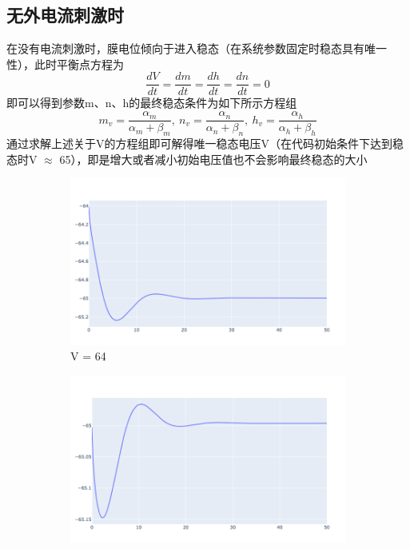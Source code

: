 \documentclass[nols, a4paper]{tufte-handout}
\begin{document}
\subsection{无外电流刺激时}
在没有电流刺激时，膜电位倾向于进入稳态（在系统参数固定时稳态具有唯一性），此时平衡点方程为
\[
\frac{dV}{dt} = \frac{dm}{dt} = \frac{dh}{dt} = \frac{dn}{dt} = 0 
\]
即可以得到参数m、n、h的最终稳态条件为如下所示方程组
\[
m_v = \frac{\alpha_m}{\alpha_m + \beta_m}, \ n_v = \frac{\alpha_n}{\alpha_n + \beta_n}, \ h_v = \frac{\alpha_h}{\alpha_h + \beta_h}
\]
通过求解上述关于V的方程组即可解得唯一稳态电压V（在代码初始条件下达到稳态时V $\approx$ 65），即是增大或者减小初始电压值也不会影响最终稳态的大小

\begin{figure}[htbp]
    \centering
    \begin{subfigure}[t]{0.32\linewidth}
        \centering
        \includegraphics[width=\linewidth]{image/v64.png}
        \caption{V = 64}
        \label{fig:sub1}
    \end{subfigure}
    \hfill
    \begin{subfigure}[t]{0.32\linewidth}
        \centering
        \includegraphics[width=\linewidth]{image/v65.png}

\end{subfigure}
\end{figure}
\end{document}
